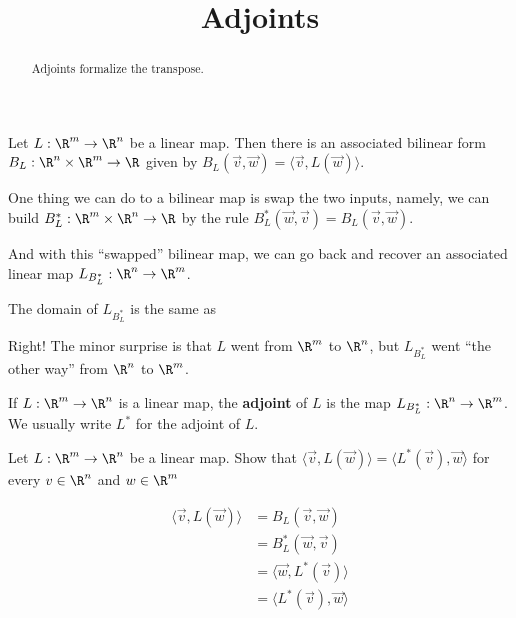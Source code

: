 \documentclass{ximera}
\title{Adjoints}
\begin{document}
\begin{abstract}
  Adjoints formalize the transpose.
\end{abstract}
	
Let $L: \R^m \to \R^n$ be a linear map.  Then there is an associated
bilinear form $B_L : \R^n \times \R^m \to \R$ given by
$B_L(\vec{v},\vec{w}) = \langle \vec{v}, L(\vec{w}) \rangle$.

One thing we can do to a bilinear map is swap the two inputs, namely,
we can build $B_L^*: \R^m \times \R^n \to \R$ by the rule $B_L^*
(\vec{w},\vec{v}) = B_L(\vec{v},\vec{w})$.

And with this ``swapped'' bilinear map, we can go back and recover an
associated linear map $L_{B_L^*} : \R^n \to \R^m$.

\begin{question}
  The domain of $L_{B_L^*}$ is the same as
  \begin{solution}
    \begin{multiple-choice}
    \end{multiple-choice}
  \end{solution}

  Right! The minor surprise is that $L$ went from $\R^m$ to $\R^n$, but $L_{B_L^*}$ went ``the other way'' from $\R^n$ to $\R^m$.
\end{question}


\begin{definition}
  If $L:\R^m \to \R^n$ is a linear map, the \textbf{adjoint} of $L$ is
  the map $L_{B_L^*} : \R^n \to \R^m$.  We usually write $L^*$ for the
  adjoint of $L$.
\end{definition}
		
Let $L: \R^m \to \R^n$ be a linear map.  
Show that $\langle \vec{v}, L(\vec{w})\rangle = \langle  L^*(\vec{v}),\vec{w}\rangle$ for every $v \in \R^n$ and $w \in \R^m$
\begin{free-response}
  \begin{align*}
    \langle \vec{v}, L(\vec{w})\rangle &= B_L(\vec{v},\vec{w})\\
    &= B_L^*(\vec{w},\vec{v})\\
    &=\langle \vec{w},L^*(\vec{v}) \rangle\\
    &=\langle L^*(\vec{v}), \vec{w}\rangle
  \end{align*}
\end{free-response}
\end{document}
